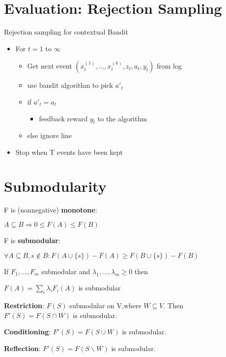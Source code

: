 \documentclass[a4paper,11pt,twocolumn]{article}
\begin{document}
\section{Evaluation: Rejection Sampling}
Rejection sampling for contextual Bandit
\begin{itemize}[noitemsep,topsep=0pt,parsep=0pt,partopsep=0pt]
\item For $t=1$ to $\infty$
\begin{itemize}[noitemsep,topsep=0pt,parsep=0pt,partopsep=0pt]
\item Get next event $(x_t^{(1)},...,x_t^{(k)},z_t,a_t,y_t)$ from log
\item use bandit algorithm to pick $a'_t$
\item if $a'_t = a_t$

\begin{itemize}[noitemsep,topsep=0pt,parsep=0pt,partopsep=0pt]
\item feedback reward $y_t$ to the algorithm
\end{itemize}

\item else ignore line
\end{itemize}
\item Stop when T events have been kept
\end{itemize}

\section{Submodularity}

F is (nonnegative) \textbf{monotone}: 

$A \subseteq B \Rightarrow 0 \leq F(A)  \leq F(B)$


F is \textbf{submodular}: 

$\forall A \subseteq B, s \notin B:  F(A \cup \lbrace s  \rbrace) - F(A) \geq F(B \cup \lbrace s \rbrace ) - F(B)$



If $F_1,...,F_m$ submodular and $\lambda_1,...,\lambda_m \geq 0 $ then

$F(A) = \sum_i \lambda_i F_i(A)$ is submodular 

\textbf{Restriction}: $F(S)$ submodular on V,where $W \subseteq V$. Then $F'(S) = F(S \cap W)$ is submodular.

\textbf{Conditioning}: $F'(S) = F(S \cup W)$ is submodular.

\textbf{Reflection}: $F'(S) = F(S \backslash W)$ is submodular.
\end{document}
